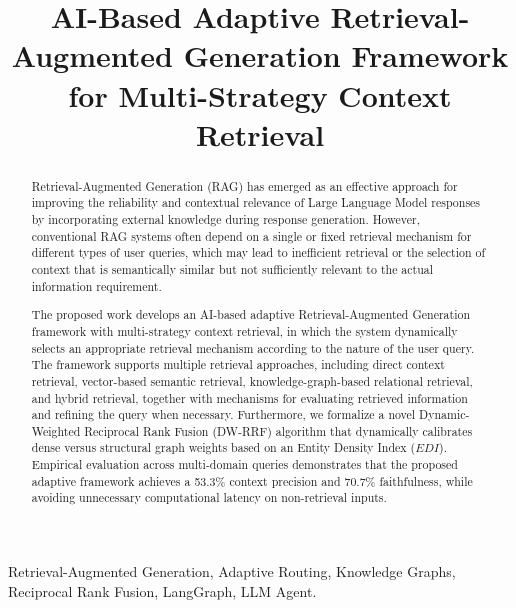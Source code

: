 \documentclass[conference]{IEEEtran}
\begin{document}
\title{AI-Based Adaptive Retrieval-Augmented Generation Framework for Multi-Strategy Context Retrieval}

\author{
}

\maketitle

\begin{abstract}
Retrieval-Augmented Generation (RAG) has emerged as an effective approach for improving the reliability and contextual relevance of Large Language Model responses by incorporating external knowledge during response generation. However, conventional RAG systems often depend on a single or fixed retrieval mechanism for different types of user queries, which may lead to inefficient retrieval or the selection of context that is semantically similar but not sufficiently relevant to the actual information requirement.

The proposed work develops an AI-based adaptive Retrieval-Augmented Generation framework with multi-strategy context retrieval, in which the system dynamically selects an appropriate retrieval mechanism according to the nature of the user query. The framework supports multiple retrieval approaches, including direct context retrieval, vector-based semantic retrieval, knowledge-graph-based relational retrieval, and hybrid retrieval, together with mechanisms for evaluating retrieved information and refining the query when necessary. Furthermore, we formalize a novel Dynamic-Weighted Reciprocal Rank Fusion (DW-RRF) algorithm that dynamically calibrates dense versus structural graph weights based on an Entity Density Index ($EDI$). Empirical evaluation across multi-domain queries demonstrates that the proposed adaptive framework achieves a 53.3\% context precision and 70.7\% faithfulness, while avoiding unnecessary computational latency on non-retrieval inputs.
\end{abstract}

\begin{IEEEkeywords}
Retrieval-Augmented Generation, Adaptive Routing, Knowledge Graphs, Reciprocal Rank Fusion, LangGraph, LLM Agent.
\end{IEEEkeywords}
\end{document}
